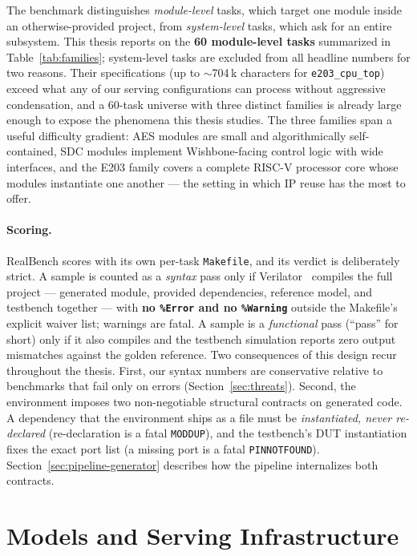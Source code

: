The benchmark distinguishes \emph{module-level} tasks, which target one module
inside an otherwise-provided project, from \emph{system-level} tasks, which
ask for an entire subsystem. This thesis reports on the \textbf{60
module-level tasks} summarized in Table~\ref{tab:families}; system-level
tasks are excluded from all headline numbers for two reasons. Their specifications
(up to $\sim$704\,k characters for \texttt{e203\_cpu\_top}) exceed what any of
our serving configurations can process without aggressive condensation, and
a 60-task universe with three distinct families is already large
enough to expose the phenomena this thesis studies. The three families span
a useful difficulty gradient: AES modules are small and algorithmically
self-contained, SDC modules implement Wishbone-facing control logic with
wide interfaces, and the E203 family covers a complete RISC-V processor
core whose modules instantiate one another --- the setting in which IP reuse
has the most to offer.

\paragraph{Scoring.}
RealBench scores with its own per-task \texttt{Makefile}, and its verdict is
deliberately strict. A sample is counted as a \emph{syntax} pass only if
Verilator~\citep{verilator} compiles the full project --- generated module,
provided dependencies, reference model, and testbench together --- with
\textbf{no \texttt{\%Error} and no \texttt{\%Warning}} outside the Makefile's
explicit waiver list; warnings are fatal. A sample is a \emph{functional}
pass (``pass'' for short) only if it also compiles and the testbench
simulation reports zero output mismatches against the golden reference.
Two consequences of this design recur throughout the thesis. First, our
syntax numbers are conservative relative to benchmarks that fail only on
errors (Section~\ref{sec:threats}). Second, the environment imposes two
non-negotiable structural contracts on generated code. A dependency that the
environment ships as a file must be \emph{instantiated, never re-declared}
(re-declaration is a fatal \texttt{MODDUP}), and the testbench's DUT
instantiation fixes the exact port list (a missing port is a fatal
\texttt{PINNOTFOUND}). Section~\ref{sec:pipeline-generator} describes how the
pipeline internalizes both contracts.

\section{Models and Serving Infrastructure}
\label{sec:setup-models}

